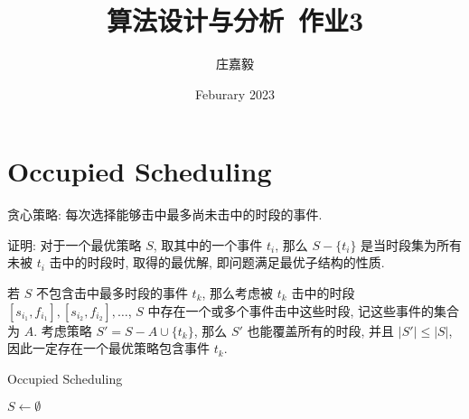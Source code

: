 \documentclass{ctexart}
\title{算法设计与分析~作业3}
\author{庄嘉毅}
\date{Feburary 2023}
\begin{document}
\maketitle

\section{Occupied Scheduling}

贪心策略: 每次选择能够击中最多尚未击中的时段的事件.

证明: 对于一个最优策略 $S$, 取其中的一个事件 $t_i$, 那么 $S-\{t_i\}$ 是当时段集为所有未被 $t_i$ 击中的时段时, 取得的最优解, 即问题满足最优子结构的性质.

若 $S$ 不包含击中最多时段的事件 $t_k$, 那么考虑被 $t_k$ 击中的时段 $[s_{i_1}, f_{i_1}], [s_{i_2}, f_{i_2}], \ldots$, $S$ 中存在一个或多个事件击中这些时段, 记这些事件的集合为 $A$. 考虑策略 $S'=S-A\cup \{t_k\}$, 那么 $S'$ 也能覆盖所有的时段, 并且 $|S'|\le |S|$, 因此一定存在一个最优策略包含事件 $t_k$.

\begin{algorithm}[H]
    \caption{Occupied Scheduling}
    \begin{algorithmic}
        \State $S \gets \emptyset$
        \EndFunction
    \end{algorithmic}
\end{algorithm}
\end{document}
